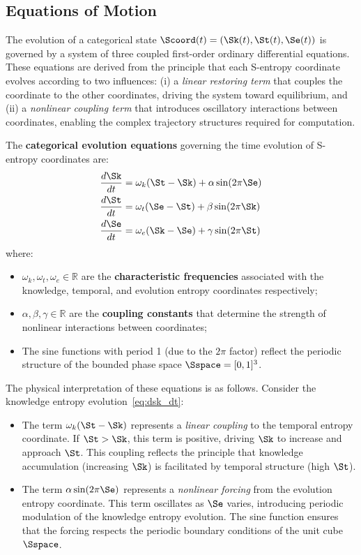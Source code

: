 \subsection{Equations of Motion}

The evolution of a categorical state $\Scoord(t) = (\Sk(t), \St(t), \Se(t))$ is governed by a system of three coupled first-order ordinary differential equations. These equations are derived from the principle that each S-entropy coordinate evolves according to two influences: (i) a \textit{linear restoring term} that couples the coordinate to the other coordinates, driving the system toward equilibrium, and (ii) a \textit{nonlinear coupling term} that introduces oscillatory interactions between coordinates, enabling the complex trajectory structures required for computation.

\begin{definition}
\label{def:categorical_dynamics}
The \textbf{categorical evolution equations} governing the time evolution of S-entropy coordinates are:
\begin{align}
\frac{d\Sk}{dt} &= \omega_k (\St - \Sk) + \alpha \sin(2\pi \Se) \label{eq:dsk_dt} \\
\frac{d\St}{dt} &= \omega_t (\Se - \St) + \beta \sin(2\pi \Sk) \label{eq:dst_dt} \\
\frac{d\Se}{dt} &= \omega_e (\Sk - \Se) + \gamma \sin(2\pi \St) \label{eq:dse_dt}
\end{align}
where:
\begin{itemize}
    \item $\omega_k, \omega_t, \omega_e \in \mathbb{R}$ are the \textbf{characteristic frequencies} associated with the knowledge, temporal, and evolution entropy coordinates respectively;
    \item $\alpha, \beta, \gamma \in \mathbb{R}$ are the \textbf{coupling constants} that determine the strength of nonlinear interactions between coordinates;
    \item The sine functions with period 1 (due to the $2\pi$ factor) reflect the periodic structure of the bounded phase space $\Sspace = [0,1]^3$.
\end{itemize}
\end{definition}

The physical interpretation of these equations is as follows. Consider the knowledge entropy evolution~\eqref{eq:dsk_dt}:
\begin{itemize}
    \item The term $\omega_k(\St - \Sk)$ represents a \textit{linear coupling} to the temporal entropy coordinate. If $\St > \Sk$, this term is positive, driving $\Sk$ to increase and approach $\St$. This coupling reflects the principle that knowledge accumulation (increasing $\Sk$) is facilitated by temporal structure (high $\St$).
    \item The term $\alpha \sin(2\pi \Se)$ represents a \textit{nonlinear forcing} from the evolution entropy coordinate. This term oscillates as $\Se$ varies, introducing periodic modulation of the knowledge entropy evolution. The sine function ensures that the forcing respects the periodic boundary conditions of the unit cube $\Sspace$.
\end{itemize}

